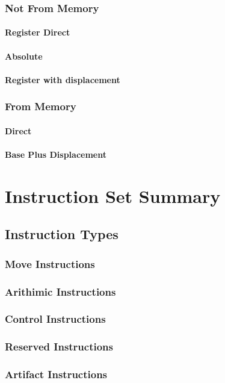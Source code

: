 \documentclass[oneside, a4paper]{memoir}
\begin{document}
\subsection{Not From Memory}
\subsubsection{Register Direct}
\subsubsection{Absolute}
\subsubsection{Register with displacement}
\subsection{From Memory}
\subsubsection{Direct}
\subsubsection{Base Plus Displacement}

\chapter{Instruction Set Summary}
\section{Instruction Types}
\subsection{Move Instructions}
\subsection{Arithimic Instructions}
\subsection{Control Instructions}
\subsection{Reserved Instructions}
\subsection{Artifact Instructions}
\end{document}
